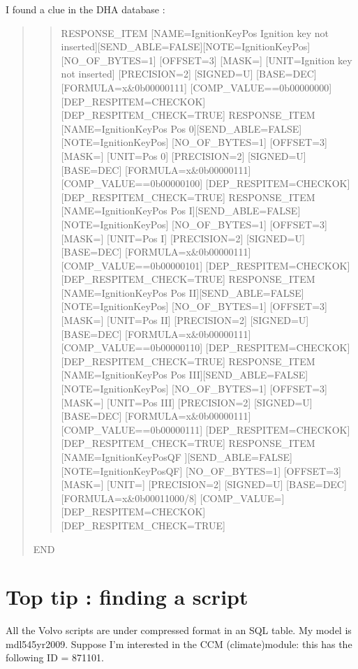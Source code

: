 \documentclass[letterpaper,10pt,english]{sphinxmanual}
\begin{document}
\sphinxAtStartPar
I found a clue in the DHA database :
\begin{quote}
\begin{quote}

\sphinxAtStartPar
RESPONSE\_ITEM {[}NAME=IgnitionKeyPos Ignition key not inserted{]}{[}SEND\_ABLE=FALSE{]}{[}NOTE=IgnitionKeyPos{]} {[}NO\_OF\_BYTES=1{]} {[}OFFSET=3{]} {[}MASK={]} {[}UNIT=Ignition key not inserted{]} {[}PRECISION=2{]} {[}SIGNED=U{]} {[}BASE=DEC{]} {[}FORMULA=x\&0b00000111{]} {[}COMP\_VALUE==0b00000000{]} {[}DEP\_RESPITEM=CHECKOK{]} {[}DEP\_RESPITEM\_CHECK=TRUE{]}
RESPONSE\_ITEM {[}NAME=IgnitionKeyPos Pos 0{]}{[}SEND\_ABLE=FALSE{]}{[}NOTE=IgnitionKeyPos{]} {[}NO\_OF\_BYTES=1{]} {[}OFFSET=3{]} {[}MASK={]} {[}UNIT=Pos 0{]} {[}PRECISION=2{]} {[}SIGNED=U{]} {[}BASE=DEC{]} {[}FORMULA=x\&0b00000111{]} {[}COMP\_VALUE==0b00000100{]} {[}DEP\_RESPITEM=CHECKOK{]} {[}DEP\_RESPITEM\_CHECK=TRUE{]}
RESPONSE\_ITEM {[}NAME=IgnitionKeyPos Pos I{]}{[}SEND\_ABLE=FALSE{]}{[}NOTE=IgnitionKeyPos{]} {[}NO\_OF\_BYTES=1{]} {[}OFFSET=3{]} {[}MASK={]} {[}UNIT=Pos I{]} {[}PRECISION=2{]} {[}SIGNED=U{]} {[}BASE=DEC{]} {[}FORMULA=x\&0b00000111{]} {[}COMP\_VALUE==0b00000101{]} {[}DEP\_RESPITEM=CHECKOK{]} {[}DEP\_RESPITEM\_CHECK=TRUE{]}
RESPONSE\_ITEM {[}NAME=IgnitionKeyPos Pos II{]}{[}SEND\_ABLE=FALSE{]}{[}NOTE=IgnitionKeyPos{]} {[}NO\_OF\_BYTES=1{]} {[}OFFSET=3{]} {[}MASK={]} {[}UNIT=Pos II{]} {[}PRECISION=2{]} {[}SIGNED=U{]} {[}BASE=DEC{]} {[}FORMULA=x\&0b00000111{]} {[}COMP\_VALUE==0b00000110{]} {[}DEP\_RESPITEM=CHECKOK{]} {[}DEP\_RESPITEM\_CHECK=TRUE{]}
RESPONSE\_ITEM {[}NAME=IgnitionKeyPos Pos III{]}{[}SEND\_ABLE=FALSE{]}{[}NOTE=IgnitionKeyPos{]} {[}NO\_OF\_BYTES=1{]} {[}OFFSET=3{]} {[}MASK={]} {[}UNIT=Pos III{]} {[}PRECISION=2{]} {[}SIGNED=U{]} {[}BASE=DEC{]} {[}FORMULA=x\&0b00000111{]} {[}COMP\_VALUE==0b00000111{]} {[}DEP\_RESPITEM=CHECKOK{]} {[}DEP\_RESPITEM\_CHECK=TRUE{]}
RESPONSE\_ITEM {[}NAME=IgnitionKeyPosQF {]}{[}SEND\_ABLE=FALSE{]}{[}NOTE=IgnitionKeyPosQF{]} {[}NO\_OF\_BYTES=1{]} {[}OFFSET=3{]} {[}MASK={]} {[}UNIT={]} {[}PRECISION=2{]} {[}SIGNED=U{]} {[}BASE=DEC{]} {[}FORMULA=x\&0b00011000/8{]} {[}COMP\_VALUE={]} {[}DEP\_RESPITEM=CHECKOK{]} {[}DEP\_RESPITEM\_CHECK=TRUE{]}
\end{quote}

\sphinxAtStartPar
END
\end{quote}


\section{Top tip : finding a script}
\label{\detokenize{volvo-diagnostic:top-tip-finding-a-script}}
\sphinxAtStartPar
All the Volvo scripts are under compressed format in an SQL table.
My model is mdl545yr2009.
Suppose I’m interested in the CCM (climate)module: this has the following ID = 871101.
\end{document}
